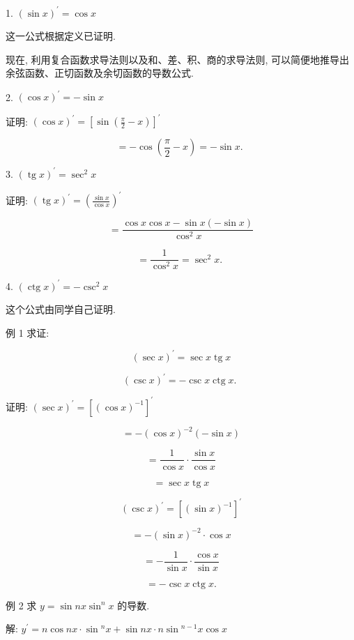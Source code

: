 \documentclass[lang=cn,newtx,10pt,scheme=chinese]{elegantbook}
\begin{document}
1. \({\left( \sin x\right) }^{\prime } = \cos x\)

这一公式根据定义已证明.

现在, 利用复合函数求导法则以及和、差、积、商的求导法则, 可以简便地推导出余弦函数、正切函数及余切函数的导数公式.

2. \({\left( \cos x\right) }^{\prime } = - \sin x\)

证明: \({\left( \cos x\right) }^{\prime } = {\left\lbrack \sin \left( \frac{\pi }{2} - x\right) \right\rbrack }^{\prime }\)

\[
= - \cos \left( {\frac{\pi }{2} - x}\right) = - \sin x\text{. }
\]

3. \({\left( \operatorname{tg}x\right) }^{\prime } = {\sec }^{2}x\)

证明: \({\left( \operatorname{tg}x\right) }^{\prime } = {\left( \frac{\sin x}{\cos x}\right) }^{\prime }\)

\[
= \frac{\cos x\cos x - \sin x\left( {-\sin x}\right) }{{\cos }^{2}x}
\]

\[
= \frac{1}{{\cos }^{2}x} = {\sec }^{2}x\text{. }
\]

4. \({\left( \operatorname{ctg}x\right) }^{\prime } = - {\csc }^{2}x\)

这个公式由同学自己证明.

例 1 求证:

\[
{\left( \sec x\right) }^{\prime } = \sec x\operatorname{tg}x
\]

\[
{\left( \csc x\right) }^{\prime } = - \csc x\operatorname{ctg}x\text{. }
\]

证明: \({\left( \sec x\right) }^{\prime } = {\left\lbrack {\left( \cos x\right) }^{-1}\right\rbrack }^{\prime }\)

\[
= - {\left( \cos x\right) }^{-2}\left( {-\sin x}\right)
\]

\[
= \frac{1}{\cos x} \cdot \frac{\sin x}{\cos x}
\]

\[
= \sec x\operatorname{tg}x
\]

\[
{\left( \csc x\right) }^{\prime } = {\left\lbrack {\left( \sin x\right) }^{-1}\right\rbrack }^{\prime }
\]

\[
= - {\left( \sin x\right) }^{-2} \cdot \cos x
\]

\[
= - \frac{1}{\sin x} \cdot \frac{\cos x}{\sin x}
\]

\[
= - \csc x\operatorname{ctg}x\text{.}
\]

例 2 求 \(y = \sin {nx}{\sin }^{n}x\) 的导数.

解: \({y}^{\prime } = n\cos {nx} \cdot \sin {}^{n}x + \sin {nx} \cdot n\sin {}^{n - 1}x\cos x\)
\end{document}
